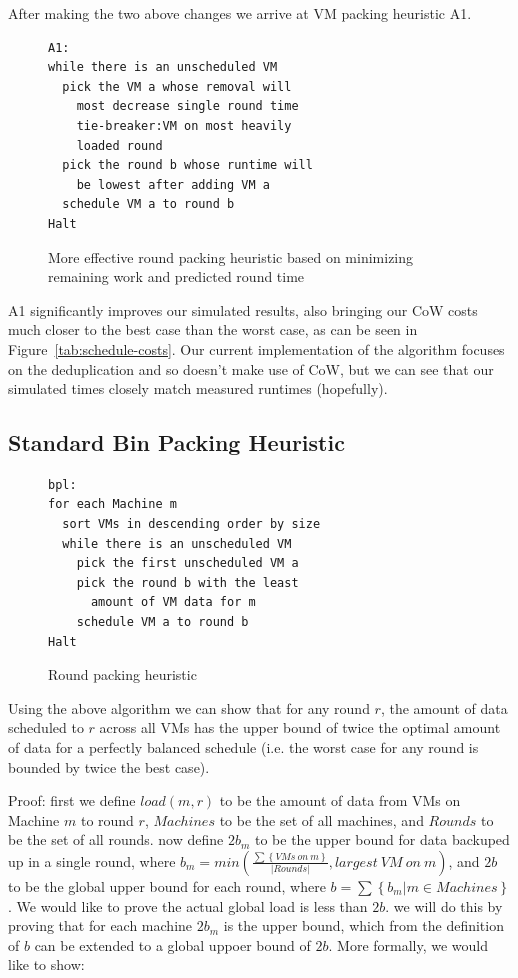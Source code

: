 After making the two above changes we arrive at VM packing heuristic A1.

\begin{figure}
\begin{lstlisting}[frame=single]
A1:
while there is an unscheduled VM
  pick the VM a whose removal will
    most decrease single round time
    tie-breaker:VM on most heavily
    loaded round
  pick the round b whose runtime will
    be lowest after adding VM a
  schedule VM a to round b
Halt
\end{lstlisting}
\caption{More effective round packing heuristic based on minimizing remaining work and predicted round time}
\end{figure}

A1 significantly improves our simulated results, also bringing our CoW costs
much closer to the best case than the worst case, as can be seen in
Figure~\ref{tab:schedule-costs}.  Our current implementation of the algorithm
focuses on the deduplication and so doesn't make use of CoW, but we can see
that our simulated times closely match measured runtimes (hopefully).


\subsection{Standard Bin Packing Heuristic}
\begin{figure}
\begin{lstlisting}[frame=single]
bpl:
for each Machine m
  sort VMs in descending order by size
  while there is an unscheduled VM
    pick the first unscheduled VM a
    pick the round b with the least
      amount of VM data for m
    schedule VM a to round b
Halt
\end{lstlisting}
\caption{Round packing heuristic}
\end{figure}

Using the above algorithm we can show that for any round $r$, the amount of
data scheduled to $r$ across all VMs has the upper bound of twice the optimal
amount of data for a perfectly balanced schedule (i.e. the worst case for any
round is bounded by twice the best case).

Proof:
first we define $load(m,r)$ to be the amount of data from VMs on Machine $m$
to round $r$, $Machines$ to be the set of all machines, and $Rounds$ to be
the set of all rounds.
now define $2b_m$ to be the upper bound for data backuped up in a single round, 
where 
$b_m = min(\frac{\sum \left\{ {VMs~on~m} \right\}}{\left\vert {Rounds} \right\vert}, largest~VM~on~m)$,
and $2b$ to be the global upper bound for each round, where
$b = \sum \left\{ b_m | m \in Machines \right\}$. We would like to prove the
actual global load is less than $2b$. we will do this by proving that for
each machine $2b_m$ is the upper bound, which from the definition of $b$ can be
extended to a global uppoer bound of $2b$. More formally, we would like to show:

